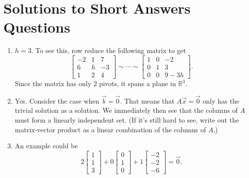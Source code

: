 \section{Solutions to Short Answers Questions}
\begin{enumerate}
	\item \(h = 3\). To see this, row reduce the following matrix to get 
		\[\begin{bmatrix}-2 & 1 & 7 \\ 6 & h & -3 \\ 1 & 2 & 4\end{bmatrix} \sim \cdots \sim \begin{bmatrix}1 & 0 & -2 \\ 0 & 1 & 3 \\ 0 & 0 & 9-3h\end{bmatrix}.\]
		Since the matrix has only 2 pivots, it spans a plane in \(\mathbb{R}^3\).
	\item Yes. Consider the case when \(\vec{b} = \vec{0}\). That means that \(A\vec{x} = \vec{0}\) only has the trivial solution as a solution. We immediately 
		then see that the columns of \(A\) must form a linearly independent set. (If it's still hard to see, write out the matrix-vector product as a linear 
		combination of the columns of \(A\),)
	\item An example could be \[2\begin{bmatrix}1 \\ 1 \\ 3\end{bmatrix} + 0\begin{bmatrix}0 \\ 1 \\ 0\end{bmatrix} + 1\begin{bmatrix}-2 \\ -2 \\ -6\end{bmatrix} = \vec{0}.\]
\end{enumerate}

